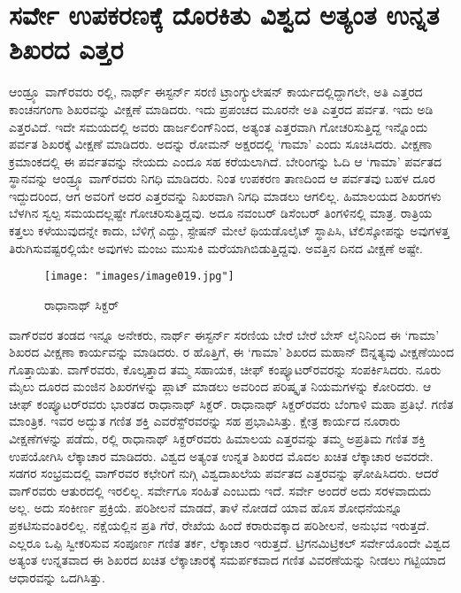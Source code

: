 
\chapter{ಸರ್ವೇ ಉಪಕರಣಕ್ಕೆ ದೊರಕಿತು ವಿಶ್ವದ ಅತ್ಯಂತ ಉನ್ನತ ಶಿಖರದ ಎತ್ತರ}

ಆಂಡ್ರ್ಯೂ ವಾಗ್​ರವರು ರಲ್ಲಿ, ನಾರ್ಥ್ ಈಸ್ಟರ್ನ್ ಸರಣಿ ಟ್ರಾಂಗ್ಯುಲೇಷನ್​ ಕಾರ್ಯ\break ದಲ್ಲಿದ್ದಾಗಲೇ, ಅತಿ ಎತ್ತರದ ಕಾಂಚನಗಂಗಾ ಶಿಖರವನ್ನು ವೀಕ್ಷಣೆ ಮಾಡಿದರು. ಇದು ಪ್ರಪಂಚದ ಮೂರನೇ ಅತಿ ಎತ್ತರದ ಪರ್ವತ. ಇದು  ಅಡಿ ಎತ್ತರವಿದೆ. ಇದೇ ಸಮಯದಲ್ಲಿ ಅವರು ಡಾರ್ಜಲಿಂಗ್​ನಿಂದ, ಅತ್ಯಂತ ಎತ್ತರವಾಗಿ ಗೋಚರಿಸುತ್ತಿದ್ದ ಇನ್ನೊಂದು ಪರ್ವತ ಶಿಖರಕ್ಕೆ ವೀಕ್ಷಣೆ ಮಾಡಿದರು. ಅದನ್ನು ರೋಮನ್​ ಅಕ್ಷರದಲ್ಲಿ ‘ಗಾಮಾ’ ಎಂದು ಸೂಚಿಸಿದರು. ವೀಕ್ಷಣಾ ಕ್ರಮಾಂಕದಲ್ಲಿ ಈ ಪರ್ವತವನ್ನು ನೇಯದು ಎಂದೂ ಸಹ ಕರೆಯಲಾಗಿದೆ. ಬೇರಿಂಗನ್ನು ಓದಿ ಆ ‘ಗಾಮಾ’ ಪರ್ವತದ ಸ್ಥಾನವನ್ನು ಆಂಡ್ರ್ಯೂ ವಾಗ್​ರವರು ನಿಗಧಿ ಮಾಡಿದರು. ನಿಂತ ಉಪಕರಣ ತಾಣದಿಂದ ಆ ಪರ್ವತವು ಬಹಳ ದೂರ ಇದ್ದುದರಿಂದ, ಆಗ ಅವರಿಗೆ ಅದರ ಎತ್ತರವನ್ನು ನಿಖರವಾಗಿ ನಿಗಧಿ ಮಾಡಲು ಆಗಲಿಲ್ಲ. ಹಿಮಾಲಯದ ಶಿಖರಗಳು ಬೆಳಗಿನ ಸ್ವಲ್ಪ ಸಮಯದಲ್ಲಷ್ಟೇ ಗೋಚರಿಸುತ್ತಿದ್ದವು. ಅದೂ ನವಂಬರ್​ ಡಿಸೆಂಬರ್​ ತಿಂಗಳಿನಲ್ಲಿ ಮಾತ್ರ. ರಾತ್ರಿಯ ಕತ್ತಲು ಕಳೆಯುವುದನ್ನೇ ಕಾದು, ಬೆಳಿಗ್ಗೆ ಎದ್ದು, ಸ್ಟೇಷನ್​ ಮೇಲೆ ಥಿಯಡೊಲೈಟ್​ ಸ್ಥಾಪಿಸಿ, ಟೆಲಿಸ್ಕೋಪನ್ನು ಅವುಗಳತ್ತ ತಿರುಗಿಸುವಷ್ಟರಲ್ಲಿಯೇ ಅವುಗಳು ಮಂಜು ಮುಸುಕಿ ಮರೆಯಾಗಿಬಿಡುತ್ತಿದ್ದವು. ಅವತ್ತಿನ ದಿನದ ವೀಕ್ಷಣೆ ಅಷ್ಟೇ.

\begin{figure}
\texttt{[image: "images/image019.jpg"]}
\caption{ರಾಧಾನಾಥ್​ ಸಿಕ್ದರ್​}\label{chap15-fig1}
\end{figure}

ವಾಗ್​ರವರ ತಂಡದ ಇನ್ನೂ ಅನೇಕರು, ನಾರ್ಥ್ ಈಸ್ಟರ್ನ್ ಸರಣಿಯ ಬೇರೆ ಬೇರೆ ಬೇಸ್​ ಲೈನಿನಿಂದ ಈ ‘ಗಾಮಾ’ ಶಿಖರದ ವೀಕ್ಷಣಾ ಕಾರ್ಯವನ್ನು ಮಾಡಿದರು. ರ ಹೊತ್ತಿಗೆ, ಈ ‘ಗಾಮಾ’ ಶಿಖರದ ಮಹಾನ್​ ಔನ್ನತ್ಯವು ವೀಕ್ಷಣೆಯಿಂದ ಗೊತ್ತಾಯಿತು. ವಾಗ್​ರವರು, ಕೊಲ್ಕತ್ತಾದ ತಮ್ಮ ಸಹಾಯಕ, ಚೀಫ್​ ಕಂಪ್ಯೂಟರ್​ರವರನ್ನು ಸಂಪರ್ಕಿಸಿದರು. ನೂರು ಮೈಲು ದೂರದ ಮಂಜಿನ ಶಿಖರಗಳನ್ನು ಪ್ಲಾಟ್​ ಮಾಡಲು ಅವರಿಂದ ಪರಿಷ್ಕೃತ ನಿಯಮಗಳನ್ನು ಕೋರಿದರು. ಆ ಚೀಫ್​ ಕಂಪ್ಯೂಟರ್​ರವರು ಭಾರತದ ರಾಧಾನಾಥ್​ ಸಿಕ್ದರ್​. ರಾಧಾನಾಥ್​ ಸಿಕ್ದರ್​ರವರು ಬೆಂಗಾಳಿ ಮಹಾ ಪ್ರತಿಭೆ. ಗಣಿತ ಮಾಂತ್ರಿಕ. ಇವರ ಅದ್ಭುತ ಗಣಿತ ಶಕ್ತಿ ಎವರೆಸ್ಟ್​ರವರನ್ನು ಸಹ ಪ್ರಭಾವಿಸಿತ್ತು. ಕ್ಷೇತ್ರ ಕಾರ್ಯದ ನೂರಾರು ವೀಕ್ಷಣೆಗಳನ್ನು ಪಡೆದು, ರಲ್ಲಿ ರಾಧಾನಾಥ್​ ಸಿಕ್ದರ್​ರವರು ಹಿಮಾಲಯ ಎತ್ತರವನ್ನು ತಮ್ಮ ಅಪ್ರತಿಮ ಗಣಿತ ಶಕ್ತಿ ಉಪಯೋಗಿಸಿ ಲೆಕ್ಕಾಚಾರ ಮಾಡಿದರು. ವಿಶ್ವದ ಅತ್ಯಂತ ಉನ್ನತ ಶಿಖರದ ಮೊದಲ ಖಚಿತ ಲೆಕ್ಕಾಚಾರ ಅವರದೇ. ಸಡಗರ ಸಂಭ್ರಮದಲ್ಲಿ ವಾಗ್​ರವರ ಕಛೇರಿಗೆ ನುಗ್ಗಿ ವಿಶ್ವದಾಖಲೆಯ ಪರ್ವತದ ಎತ್ತರವನ್ನು ಘೋಷಿಸಿದರು. ಆದರೆ ವಾಗ್​ರವರು ಆತುರದಲ್ಲಿ ಇರಲಿಲ್ಲ. ಸರ್ವೇಗೂ ಸಂಹಿತೆ ಎಂಬುದು ಇದೆ. ಸರ್ವೇ ಅಂದರೆ ಅದು ಸರಳವಾದುದು ಅಲ್ಲ. ಅದು ಸಂಕೀರ್ಣ ಪ್ರಕ್ರಿಯೆ. ಪರಿಶೀಲನೆ ಮಾಡದೆ, ತಾಳೆ ನೋಡದೆ ಯಾವ ಹೊಸ ಶೋಧನೆಯನ್ನೂ ಪ್ರಕಟಿಸುವಂತಿರಲಿಲ್ಲ. ನಕ್ಷೆಯಲ್ಲಿನ ಪ್ರತಿ ಗೆರೆ, ರೇಖೆಯ ಹಿಂದೆ ಕರಾರುವಕ್ಕಾದ ಪರಿಶೀಲನೆ, ಅನುಭವ ಇರುತ್ತದೆ. ಎಲ್ಲರೂ ಒಪ್ಪಿ ಸ್ವೀಕರಿಸುವ ಸಂಪೂರ್ಣ ಗಣಿತ ತರ್ಕ, ಲೆಕ್ಕಾಚಾರ ಇರುತ್ತದೆ. ಟ್ರಿಗನಮಿಟ್ರಿಕಲ್​ ಸರ್ವೇಯೊಂದೇ ವಿಶ್ವದ ಅತ್ಯಂತ ಉನ್ನತವಾದ ಈ ಶಿಖರದ ಖಚಿತ ಲೆಕ್ಕಾಚಾರಕ್ಕೆ ಸಮರ್ಪಕವಾದ ಗಣಿತ ವಿವರಣೆಯನ್ನು ನೀಡಲು ಗಟ್ಟಿಯಾದ ಆಧಾರವನ್ನು ಒದಗಿಸಿತ್ತು. 

